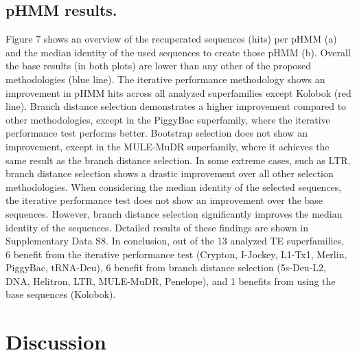 \documentclass[unnumsec,webpdf,contemporary,large]{oup-authoring-template}%
\theoremstyle{thmstyleone}%
\theoremstyle{thmstyletwo}%
\theoremstyle{thmstylethree}%
\begin{document}
\subsection{pHMM results.}\label{subsec3_4}
Figure 7 shows an overview of the recuperated sequences (hits) per pHMM (a) and the median identity of the used sequences to create those pHMM (b). Overall the base results (in both plots) are lower than any other of the proposed methodologies (blue line). 
The iterative performance methodology shows an improvement in pHMM hits across all analyzed superfamilies except Kolobok (red line). Branch distance selection demonstrates a higher improvement compared to other methodologies, except in the PiggyBac superfamily, where the iterative performance test performs better. Bootstrap selection does not show an improvement, except in the MULE-MuDR superfamily, where it achieves the same result as the branch distance selection. In some extreme cases, such as LTR, branch distance selection shows a drastic improvement over all other selection methodologies.
When considering the median identity of the selected sequences, the iterative performance test does not show an improvement over the base sequences. However, branch distance selection significantly improves the median identity of the sequences. Detailed results of these findings are shown in Supplementary Data S8.
In conclusion, out of the 13 analyzed TE superfamilies, 6 benefit from the iterative performance test (Crypton, I-Jockey, L1-Tx1, Merlin, PiggyBac, tRNA-Deu), 6 benefit from branch distance selection (5s-Deu-L2, DNA, Helitron, LTR, MULE-MuDR, Penelope), and 1 benefits from using the base sequences (Kolobok).

\section{Discussion}\label{sec4}
\end{document}
